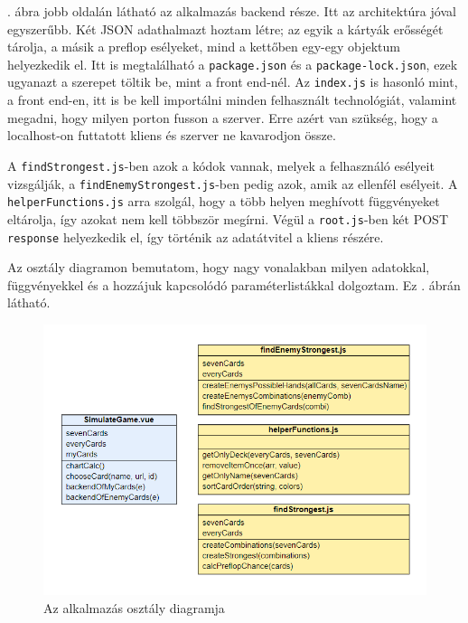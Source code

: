 . ábra jobb oldalán látható az alkalmazás backend része. Itt az architektúra jóval egyszerűbb. Két JSON adathalmazt hoztam létre; az egyik a kártyák erősségét tárolja, a másik a preflop esélyeket, mind a kettőben egy-egy objektum helyezkedik el. Itt is megtalálható a \texttt{package.json} és a \texttt{package-lock.json}, ezek ugyanazt a szerepet töltik be, mint a front end-nél. Az \texttt{index.js} is hasonló mint, a front end-en, itt is be kell importálni minden felhasznált technológiát, valamint megadni, hogy milyen porton fusson a szerver. Erre azért van szükség, hogy a localhost-on futtatott kliens és szerver ne kavarodjon össze.

A \texttt{findStrongest.js}-ben azok a kódok vannak, melyek a felhasználó esélyeit vizsgálják, a \texttt{findEnemyStrongest.js}-ben pedig azok, amik az ellenfél esélyeit. A \\ \texttt{helperFunctions.js} arra szolgál, hogy a több helyen meghívott függvényeket eltárolja, így azokat nem kell többször megírni. Végül a \texttt{root.js}-ben két POST \texttt{response} helyezkedik el, így történik az adatátvitel a kliens részére.

Az osztály diagramon bemutatom, hogy nagy vonalakban milyen adatokkal, függvényekkel és a hozzájuk kapcsolódó paraméterlistákkal dolgoztam. Ez . ábrán látható.

\begin{figure}[h]
	\centering
	\includegraphics[scale=1]{images/class-model.png}
	\caption{Az alkalmazás osztály diagramja}
	\label{fig:class-model}
\end{figure}

